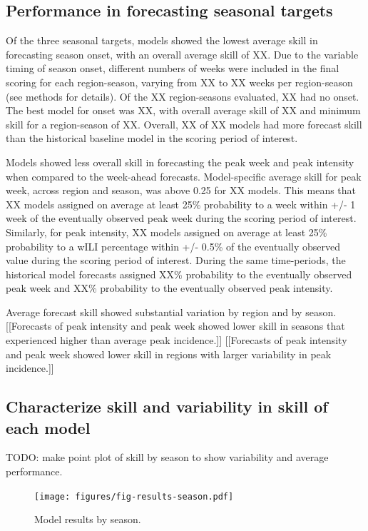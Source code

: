 \documentclass{article}
\begin{document}
\subsection{Performance in forecasting seasonal targets}

Of the three seasonal targets, models showed the lowest average skill in forecasting season onset, with an overall average skill of XX. 
Due to the variable timing of season onset, different numbers of weeks were included in the final scoring for each region-season, varying from XX to XX weeks per region-season (see methods for details).
Of the XX region-seasons evaluated, XX had no onset. 
The best model for onset was XX, with overall average skill of XX and minimum skill for a region-season of XX.
Overall, XX of XX models had more forecast skill than the historical baseline model in the scoring period of interest.


Models showed less overall skill in forecasting the peak week and peak intensity when compared to the week-ahead forecasts.
Model-specific average skill for peak week, across region and season, was above 0.25 for XX models. 
This means that XX models assigned on average at least 25\% probability to a week within +/- 1 week of the eventually observed peak week during the scoring period of interest.
Similarly, for peak intensity, XX models assigned on average at least 25\% probability to a wILI percentage within +/- 0.5\% of the eventually observed value during the scoring period of interest.
During the same time-periods, the historical model forecasts assigned XX\% probability to the eventually observed peak week and XX\% probability to the eventually observed peak intensity.

Average forecast skill showed substantial variation by region and by season.
[[Forecasts of peak intensity and peak week showed lower skill in seasons that experienced higher than average peak incidence.]]
[[Forecasts of peak intensity and peak week showed lower skill in regions with larger variability in peak incidence.]]

\subsection{Characterize skill and variability in skill of each model}

TODO: make point plot of skill by season to show variability and average performance.

\begin{figure}[htbp]
\begin{center}
\texttt{[image: figures/fig-results-season.pdf]}
\caption{Model results by season.}
\label{fig:results-season}
\end{center}
\end{figure}
\end{document}
